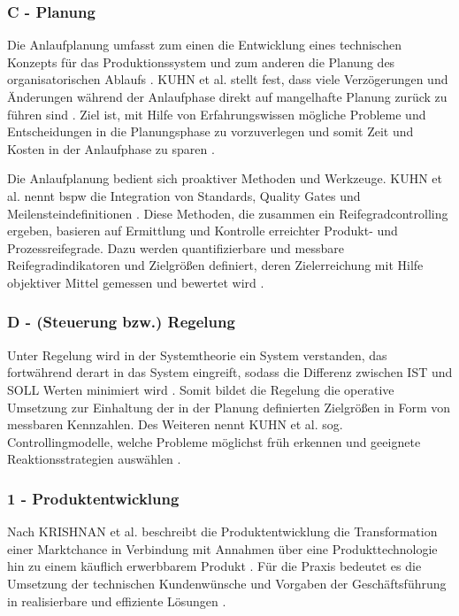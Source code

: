 \subsubsection*{C - Planung}

Die Anlaufplanung umfasst zum einen die Entwicklung eines technischen Konzepts für das Produktionssystem und zum anderen die Planung des organisatorischen Ablaufs \cite[149]{Risse2002}. %
KUHN et al. stellt fest, dass viele Verzögerungen und Änderungen während der Anlaufphase direkt auf mangelhafte Planung zurück zu führen sind \cite[19]{Kuhn2002}. 
Ziel ist, mit Hilfe von Erfahrungswissen mögliche Probleme und Entscheidungen in die Planungsphase zu vorzuverlegen und somit Zeit und Kosten in der Anlaufphase zu sparen \cite[149]{Risse2002}.  %

Die Anlaufplanung bedient sich proaktiver Methoden und Werkzeuge. KUHN et al. nennt \gls{bspw} die Integration von Standards, Quality Gates und Meilensteindefinitionen \cite[19]{Kuhn2002}. 
Diese Methoden, die zusammen ein Reifegradcontrolling ergeben, basieren auf Ermittlung und Kontrolle erreichter Produkt- und Prozessreifegrade. Dazu werden quantifizierbare und messbare Reifegradindikatoren und Zielgrößen definiert, deren Zielerreichung mit Hilfe objektiver Mittel gemessen und bewertet wird \cite[62--63]{Schuh2008}. 

\subsubsection*{D - (Steuerung bzw.) Regelung}

Unter Regelung wird in der Systemtheorie ein System verstanden, das fortwährend derart in das System eingreift, sodass die Differenz zwischen IST und SOLL Werten minimiert wird \cite[136]{diniec60050}. Somit bildet die Regelung die operative Umsetzung zur Einhaltung der in der Planung definierten Zielgrößen in Form von messbaren Kennzahlen. 
Des Weiteren nennt KUHN et al. sog. Controllingmodelle, welche Probleme möglichst früh erkennen und geeignete Reaktionsstrategien auswählen \cite{Kuhn2002}. 

\subsubsection*{1 - Produktentwicklung}
Nach KRISHNAN et al. beschreibt die Produktentwicklung die Transformation einer Marktchance in Verbindung mit Annahmen über eine Produkttechnologie hin zu einem käuflich erwerbbarem Produkt \cite{Krishnan2001}. Für die Praxis bedeutet es die Umsetzung der technischen Kundenwünsche und Vorgaben der Geschäftsführung in realisierbare und effiziente Lösungen \cite[9]{Scholz2010}. 

